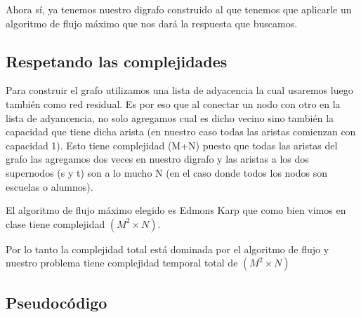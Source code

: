 Ahora sí, ya tenemos nuestro digrafo construido al que tenemos que aplicarle un algoritmo de flujo máximo que nos dará la respuesta que buscamos.

\subsection{Respetando las complejidades}

Para construir el grafo utilizamos una lista de adyacencia la cual usaremos luego también como red residual. Es por eso que al conectar un nodo con otro en la lista de adyancencia, no solo agregamos cual es dicho vecino sino también la capacidad que tiene dicha arista (en nuestro caso todas las aristas comienzan con capacidad 1). Esto tiene complejidad \bigo(M+N) puesto que todas las aristas del grafo las agregamos dos veces en nuestro digrafo y las aristas a los dos supernodos (s y t) son a lo mucho N (en el caso donde todos los nodos son escuelas o alumnos). 

El algoritmo de flujo máximo elegido es Edmons Karp que como bien vimos en clase tiene complejidad \bigo$(M^2 \times N)$.

Por lo tanto la complejidad total está dominada por el algoritmo de flujo y nuestro problema tiene complejidad temporal total de \bigo$(M^2 \times N)$

\subsection{Pseudocódigo}
	
